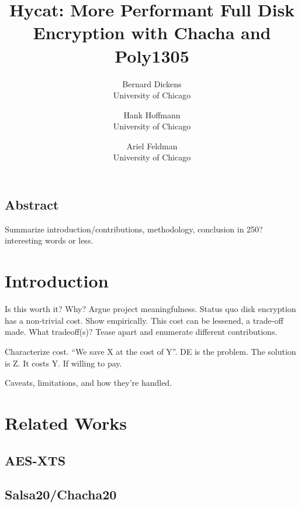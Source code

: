 \documentclass[letterpaper,twocolumn,10pt]{article}
\begin{document}
\date{}

\title{\Large \bf Hycat: More Performant Full Disk Encryption with Chacha and Poly1305}

\author{
{\rm Bernard Dickens}\\
University of Chicago
\and
{\rm Hank Hoffmann}\\
University of Chicago
\and
{\rm Ariel Feldman}\\
University of Chicago
} %

\maketitle

\thispagestyle{empty}


\subsection*{Abstract}
Summarize introduction/contributions, methodology, conclusion in 250? interesting words or less.

\section{Introduction}
Is this worth it? Why? Argue project meaningfulness. Status quo disk encryption has a non-trivial cost. Show empirically.
This cost can be lessened, a trade-off made. What tradeoff(s)? Tease apart and enumerate different contributions.

Characterize cost. ``We save X at the cost of Y''. DE is the problem. The solution is Z. It costs Y. If willing to pay.

Caveats, limitations, and how they're handled.

\section{Related Works}
\subsection{AES-XTS}
\subsection{Salsa20/Chacha20}
\end{document}
